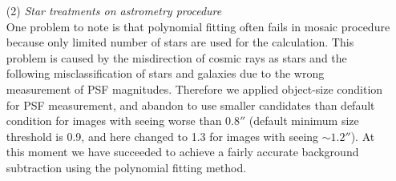 \documentclass[iop, apj]{emulateapj}
\newcommand{\?}{\stackrel{?}{=}}
\begin{document}
\begin{itemize}
\begin{figure}[t]
\label{fig:m31fit}
\end{figure}
%
%
\item[(2)]{\it Star treatments on astrometry procedure}\\
%
One problem to note is that polynomial fitting often fails in mosaic procedure because 
only limited number of stars are used for the calculation. 
This problem is caused by the misdirection of cosmic rays as stars and the following misclassification of stars and galaxies due to the wrong measurement of PSF magnitudes. 
Therefore we applied object-size condition for PSF measurement, and abandon to use smaller candidates than default condition for images with seeing worse than $0.8''$ (default minimum size threshold is 0.9, and here changed to 1.3 for images with seeing $\sim1.2''$). 
At this moment we have succeeded to achieve a fairly accurate background subtraction using the polynomial fitting method. %


\end{itemize}
\end{document}

